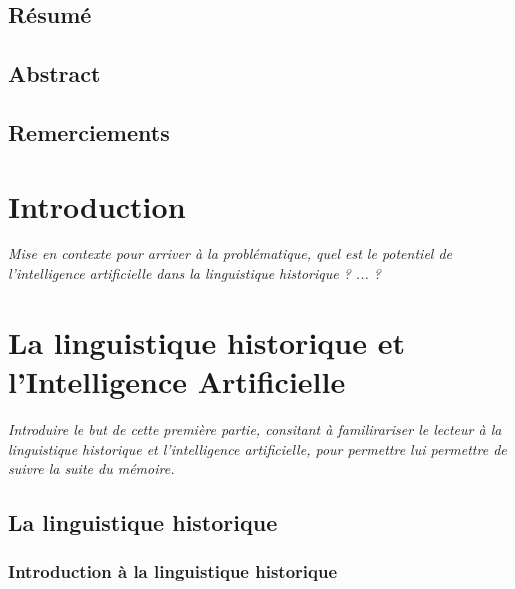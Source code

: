 \documentclass[12pt, french, twoside]{report}
\begin{document}
\section{Résumé}
\section{Abstract}
\section{Remerciements}


\tableofcontents
\listoffigures
\listoftables %

\printglossary %

\chapter{Introduction}
\textit{Mise en contexte pour arriver à la problématique, quel est le potentiel de l'intelligence artificielle dans la linguistique historique ? ... ?}

\chapter{La linguistique historique et l'Intelligence Artificielle}

\textit{Introduire le but de cette première partie, consitant à familirariser le lecteur à la linguistique historique et l'intelligence artificielle, pour permettre lui permettre de suivre la suite du mémoire.}

\section{La linguistique historique}
\subsection{Introduction à la linguistique historique}

\end{document}
